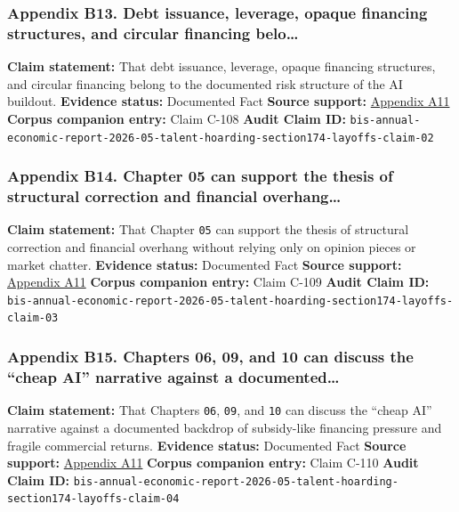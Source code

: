 \documentclass[
  american,
  11pt,
  letterpaper,
]{article}
\begin{document}
\subsubsection{Appendix B13. Debt issuance, leverage, opaque financing
structures, and circular financing
belo\ldots{}}\label{appendix-b13-debt-issuance-leverage-opaque-financing-structures-and-circular-financing-belo}

\textbf{Claim statement:} That debt issuance, leverage, opaque financing
structures, and circular financing belong to the documented risk
structure of the AI buildout. \textbf{Evidence status:} Documented Fact
\textbf{Source support:}
\hyperref[appendix-a11-annual-economic-report-2026]{Appendix A11}
\textbf{Corpus companion entry:} Claim C-108 \textbf{Audit Claim ID:}
\texttt{bis-annual-economic-report-2026-05-talent-hoarding-section174-layoffs-claim-02}

\subsubsection{Appendix B14. Chapter 05 can support the thesis of
structural correction and financial
overhang\ldots{}}\label{appendix-b14-chapter-05-can-support-the-thesis-of-structural-correction-and-financial-overhang}

\textbf{Claim statement:} That Chapter \texttt{05} can support the
thesis of structural correction and financial overhang without relying
only on opinion pieces or market chatter. \textbf{Evidence status:}
Documented Fact \textbf{Source support:}
\hyperref[appendix-a11-annual-economic-report-2026]{Appendix A11}
\textbf{Corpus companion entry:} Claim C-109 \textbf{Audit Claim ID:}
\texttt{bis-annual-economic-report-2026-05-talent-hoarding-section174-layoffs-claim-03}

\subsubsection{Appendix B15. Chapters 06, 09, and 10 can discuss the
``cheap AI'' narrative against a
documented\ldots{}}\label{appendix-b15-chapters-06-09-and-10-can-discuss-the-cheap-ai-narrative-against-a-documented}

\textbf{Claim statement:} That Chapters \texttt{06}, \texttt{09}, and
\texttt{10} can discuss the ``cheap AI'' narrative against a documented
backdrop of subsidy-like financing pressure and fragile commercial
returns. \textbf{Evidence status:} Documented Fact \textbf{Source
support:} \hyperref[appendix-a11-annual-economic-report-2026]{Appendix
A11} \textbf{Corpus companion entry:} Claim C-110 \textbf{Audit Claim
ID:}
\texttt{bis-annual-economic-report-2026-05-talent-hoarding-section174-layoffs-claim-04}
\end{document}
